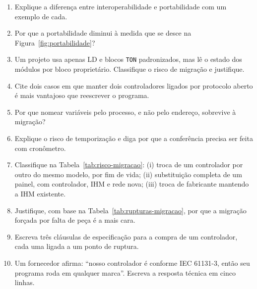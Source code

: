 \begin{exercicios}
\begin{enumerate}[label=\alph*)]
  \item Explique a diferença entre interoperabilidade e portabilidade com um exemplo de cada.
  \item Por que a portabilidade diminui à medida que se desce na Figura~\ref{fig:portabilidade}?
  \item Um projeto usa apenas LD e blocos \texttt{TON} padronizados, mas lê o estado dos módulos por
        bloco proprietário. Classifique o risco de migração e justifique.
  \item Cite dois casos em que manter dois controladores ligados por protocolo aberto é mais
        vantajoso que reescrever o programa.
  \item Por que nomear variáveis pelo processo, e não pelo endereço, sobrevive à migração?
  \item Explique o risco de temporização e diga por que a conferência precisa ser feita com
        cronômetro.
  \item Classifique na Tabela~\ref{tab:risco-migracao}: (i) troca de um controlador por outro do mesmo
        modelo, por fim de vida; (ii) substituição completa de um painel, com controlador, IHM e rede
        nova; (iii) troca de fabricante mantendo a IHM existente.
  \item Justifique, com base na Tabela~\ref{tab:rupturas-migracao}, por que a migração forçada por
        falta de peça é a mais cara.
  \item Escreva três cláusulas de especificação para a compra de um controlador, cada uma ligada a um
        ponto de ruptura.
  \item Um fornecedor afirma: ``nosso controlador é conforme IEC 61131-3, então seu programa roda em
        qualquer marca''. Escreva a resposta técnica em cinco linhas.
\end{enumerate}
\end{exercicios}
